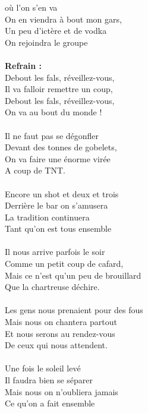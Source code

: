 \vspace{-0.2cm}
 où l'on s'en va
\\On en viendra à bout mon gars,
\\Un peu d'ictère et de vodka
\\On rejoindra le groupe
\\\\\textbf{Refrain :}
\\Debout les fals, réveillez-vous,
\\Il va falloir remettre un coup,
\\Debout les fals, réveillez-vous,
\\On va au bout du monde !
\\\\Il ne faut pas se dégonfler
\\Devant des tonnes de gobelets,
\\On va faire une énorme virée
\\A coup de TNT.
\\\\Encore un shot et deux et trois
\\Derrière le bar on s'amusera
\\La tradition continuera
\\Tant qu'on est tous ensemble
\\\\Il nous arrive parfois le soir
\\Comme un petit coup de cafard,
\\Mais ce n'est qu'un peu de brouillard
\\Que la chartreuse déchire.
\\\\Les gens nous prenaient pour des fous
\\Mais nous on chantera partout
\\Et nous serons au rendez-vous
\\De ceux qui nous attendent.
\\\\Une fois le soleil levé
\\Il faudra bien se séparer
\\Mais nous on n'oubliera jamais
\\Ce qu'on a fait ensemble


\breakpage